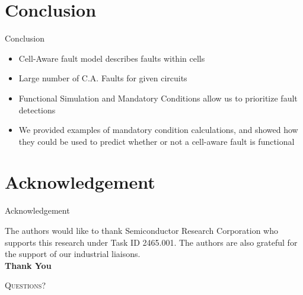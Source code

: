 \documentclass{beamer}
\begin{document}
\section{Conclusion}
\frame{\tableofcontents[currentsection]}
\begin{frame}{Conclusion}
\begin{itemize}
\pause
    \item Cell-Aware fault model describes faults within cells
    \pause
    \item Large number of C.A. Faults for given circuits
    \pause
    \item Functional Simulation and Mandatory Conditions allow us to prioritize fault detections
    \pause
    \item We provided examples of mandatory condition calculations, and showed how they could be used to predict whether or not a cell-aware fault is functional
\end{itemize}
\end{frame}

\section{Acknowledgement}
\frame{\tableofcontents[currentsection]}
\begin{frame}{Acknowledgement}

\begin{center}
The authors would like to thank Semiconductor Research Corporation who supports this research under Task ID 2465.001. The authors are also grateful for the support of our industrial liaisons. \\ 
\vspace{2em}
\textbf{Thank You}
\end{center}
\end{frame}

\begin{frame}{}
\begin{center}\Huge{\textsc{Questions?}}\end{center}
\end{frame}
\end{document}
